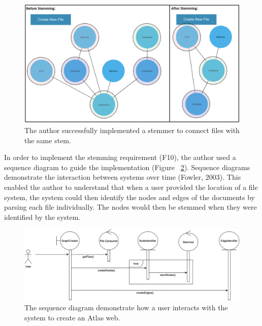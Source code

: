 \documentclass{article}
\begin{document}
\begin{table}[!h]
\centering
\caption{The functional requirement and use case description that defined the fourth iteration of Atlas.}
\label{tab:my-table}
\end{table}

\begin{figure}[!htb]
  \centering
      \includegraphics[width=1\textwidth]{images/before-after-stem.png}
  \caption{The author successfully implemented a stemmer to connect files with the same stem.}
  \label{fig:before-after-stem}
\end{figure}

In order to implement the stemming requirement (F10), the author used a sequence diagram to guide the implementation (Figure ~\ref{fig:seq}). Sequence diagrams demonstrate the interaction between systems over time (Fowler, 2003). This enabled the author to understand that when a user provided the location of a file system, the system could then identify the nodes and edges of the documents by parsing each file individually. The nodes would then be stemmed when they were identified by the system.

\begin{figure}[!htb]
  \centering
      \includegraphics[width=1\textwidth]{images/sequence-diagram.png}
  \caption{The sequence diagram demonstrate how a user interacts with the system to create an Atlas web.}
  \label{fig:seq}
\end{figure}
\end{document}
